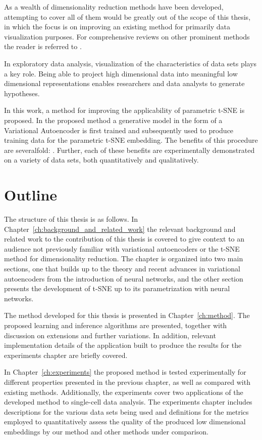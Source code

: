 As a wealth of dimensionality reduction methods have been developed, attempting to cover all of them would be greatly out of the scope of this thesis, in which the focus is on improving an existing method for primarily data visualization purposes. For comprehensive reviews on other prominent methods the reader is referred to \cite{first_dimensionality_reduction_review, second_dimensionality_reduction_review}.

In exploratory data analysis, visualization of the characteristics of data sets plays a key role. Being able to project high dimensional data into meaningful low dimensional representations enables researchers and data analysts to generate hypotheses.

In this work, a method for improving the applicability of parametric t-SNE is proposed. In the proposed method a generative model in the form of a Variational Autoencoder is first trained and subsequently used to produce training data for the parametric t-SNE embedding. The benefits of this procedure are severalfold: . Further, each of these benefits are experimentally demonstrated on a variety of data sets, both quantitatively and qualitatively.

\section{Outline}

The structure of this thesis is as follows. In Chapter~\ref{ch:background_and_related_work} the relevant background and related work to the contribution of this thesis is covered to give context to an audience not previously familiar with variational autoencoders or the t-SNE method for dimensionality reduction. The chapter is organized into two main sections, one that builds up to the theory and recent advances in variational autoencoders from the introduction of neural networks, and the other section presents the development of t-SNE up to its parametrization with neural networks.

The method developed for this thesis is presented in Chapter~\ref{ch:method}. The proposed learning and inference algorithms are presented, together with discussion on extensions and further variations. In addition, relevant implementation details of the application built to produce the results for the experiments chapter are briefly covered.

In Chapter~\ref{ch:experiments} the proposed method is tested experimentally for different properties presented in the previous chapter, as well as compared with existing methods. Additionally, the experiments cover two applications of the developed method to single-cell data analysis. The experiments chapter includes descriptions for the various data sets being used and definitions for the metrics employed to quantitatively assess the quality of the produced low dimensional embeddings by our method and other methods under comparison.

